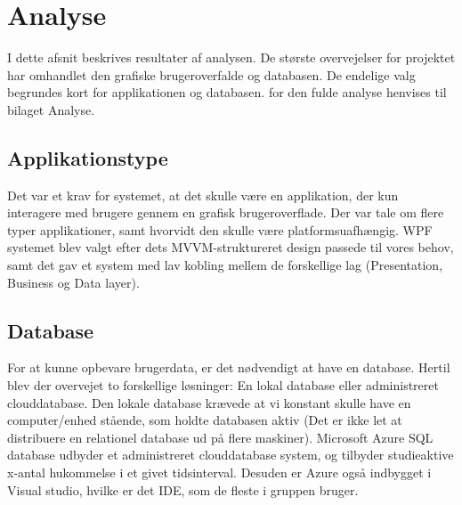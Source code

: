 \documentclass[Rapport/Rapport_main.tex]{subfiles}
\begin{document}
\section{Analyse}
I dette afsnit beskrives resultater af analysen. De største overvejelser for projektet har omhandlet den grafiske brugeroverfalde og databasen. De endelige valg begrundes kort for applikationen og databasen. for den fulde analyse henvises til bilaget Analyse.

\subsection{Applikationstype}
Det var et krav for systemet, at det skulle være en applikation, der kun interagere med brugere gennem en grafisk brugeroverflade. Der var tale om flere typer applikationer, samt hvorvidt den skulle være platformsuafhængig. WPF systemet blev valgt efter dets MVVM-struktureret design passede til vores behov, samt det gav et system med lav kobling mellem de forskellige lag (Presentation, Business og Data layer). 

\subsection{Database}
For at kunne opbevare brugerdata, er det nødvendigt at have en database. Hertil blev der overvejet to forskellige løsninger: En lokal database eller administreret clouddatabase. Den lokale database krævede at vi konstant skulle have en computer/enhed stående, som holdte databasen aktiv (Det er ikke let at distribuere en relationel database ud på flere maskiner). Microsoft Azure SQL database udbyder et administreret clouddatabase system, og tilbyder studieaktive x-antal hukommelse i et givet tidsinterval. Desuden er Azure også indbygget i Visual studio, hvilke er det IDE, som de fleste i gruppen bruger. \\\\
\end{document}

